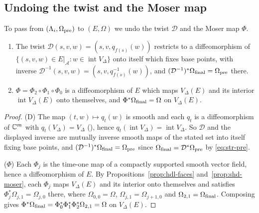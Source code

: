 \subsection{Undoing the twist and the Moser map}\label{sec:str-embeddings}

To pass from $(\Lambda_i,\Omega_{\rm pre})$ to $(E,\Omega)$ we undo the twist $\mathcal D$ and the Moser map $\Phi$.

\begin{lemma}\label{lem:str-DPhi}
\begin{enumerate}[label=(\roman*)]
\item[(D)] The twist $\mathcal D(s,v,w)=(s,v,q_{f(s)}(w))$ restricts to a diffeomorphism of
$\{(s,v,w)\in E|_{\mathcal A}:w\in\operatorname{int}V_\Delta\}$ onto itself which fixes base points, with inverse
$\mathcal D^{-1}(s,v,w)=(s,v,q_{f(s)}^{-1}(w))$, and $(\mathcal D^{-1})^*\Omega_{\rm final}=\Omega_{\rm pre}$ there.
\item[($\Phi$)] $\Phi=\Phi_2\circ\Phi_1\circ\Phi_0$ is a diffeomorphism of $E$ which maps $V_\Delta(E)$ and its interior
$\operatorname{int}V_\Delta(E)$ onto themselves, and $\Phi^*\Omega_{\rm final}=\Omega$ on $V_\Delta(E)$.
\end{enumerate}
\end{lemma}

\begin{proof}
(D) The map $(t,w)\mapsto q_t(w)$ is smooth and each $q_t$ is a diffeomorphism of $\mathbb{C}^m$ with $q_t(V_\Delta)=V_\Delta$
(), hence $q_t(\operatorname{int}V_\Delta)=\operatorname{int}V_\Delta$. So $\mathcal D$ and the
displayed inverse are mutually inverse smooth maps of the stated set into itself fixing base points, and
$(\mathcal D^{-1})^*\Omega_{\rm final}=\Omega_{\rm pre}$ since $\Omega_{\rm final}=\mathcal D^*\Omega_{\rm pre}$ by \eqref{eq:str-pre}.

($\Phi$) Each $\Phi_j$ is the time-one map of a compactly supported smooth vector field, hence a diffeomorphism of $E$. By
Propositions~\ref{prop:hdl-faces} and~\ref{prop:shd-moser}, each $\Phi_j$ maps $V_\Delta(E)$ and its interior onto
themselves and satisfies $\Phi_j^*\Omega_{j,1}=\Omega_{j,0}$ there, where
$\Omega_{0,0}=\Omega$, $\Omega_{j,1}=\Omega_{j+1,0}$ and $\Omega_{2,1}=\Omega_{\rm final}$. Composing gives
$\Phi^*\Omega_{\rm final}=\Phi_0^*\Phi_1^*\Phi_2^*\Omega_{2,1}=\Omega$ on $V_\Delta(E)$.
\end{proof}

